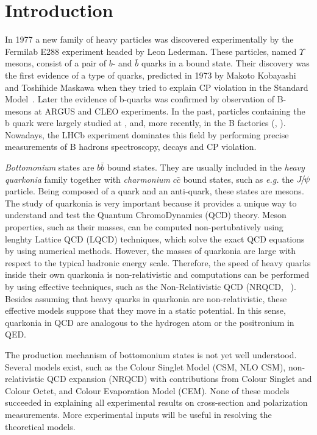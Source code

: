 \chapter{Introduction}
In 1977 a new family of heavy particles was discovered experimentally by the
Fermilab E288 experiment headed by Leon Lederman\cite{Herb:1977ek}. These
particles, named $\Upsilon$ mesons, consist of a pair of $b$- and
$\bar{b}$ quarks in a bound state. Their discovery was the first evidence of a type of
quarks, predicted in 1973 by Makoto Kobayashi and Toshihide Maskawa when they
tried to explain CP violation in the Standard Model~\cite{Kobayashi:1973fv}.
Later the evidence of b-quarks was confirmed by observation of B-mesons at
ARGUS\cite{Albrecht:1986nr} and CLEO\cite{Bebek:1987bp} experiments.
In the past, particles containing the b quark were largely studied at \lep, \tevatron and, 
more recently, in the B factories (\babar, \belle).
Nowadays, the LHCb experiment dominates this field by performing 
precise measurements of B hadrons spectroscopy, decays and CP violation. 

{\em{Bottomonium}} states are $b\bar{b}$ bound states. They are usually included in the
{\em{heavy quarkonia}} family together with {\em{charmonium}} $c\bar{c}$ bound
states, such as {\em{e.g.}} the ${{J\mskip -3mu/\mskip -2mu\psi\mskip 2mu}}$ particle. Being composed of a quark and 
an anti-quark, these states are mesons. The
study of quarkonia is very important because it provides a unique way to
understand and test the Quantum ChromoDynamics (QCD) theory. Meson properties, 
such as their masses, can be computed non-pertubatively using lenghty
Lattice QCD (LQCD) techniques, which solve the exact QCD equations by using 
numerical methods. However, the masses of quarkonia are large with respect to 
the typical hadronic energy scale. Therefore, the speed of heavy quarks 
inside their own quarkonia is non-relativistic and computations can be performed 
by using effective techniques, such as the Non-Relativistic QCD
(NRQCD, ~\cite{Dowdall:2011iy,Dowdall:2012ab}).
Besides assuming that heavy quarks in quarkonia are non-relativistic, 
these effective models suppose that they move in a static
potential\cite{Kulshreshtha:1984mw,Parmar:2010ii,shah}. In this sense, quarkonia in QCD 
are analogous to the hydrogen atom or the positronium in QED. 

The production mechanism of bottomonium states is not yet well understood.
Several models exist, such as the Colour Singlet Model (CSM, NLO CSM),
non-relativistic QCD expansion (NRQCD) with contributions from Colour Singlet and 
Colour Octet, and Colour Evaporation Model (CEM). None of these models succeeded in
explaining all experimental results on cross-section and polarization measurements.
More experimental inputs will be useful in resolving the theoretical models.

